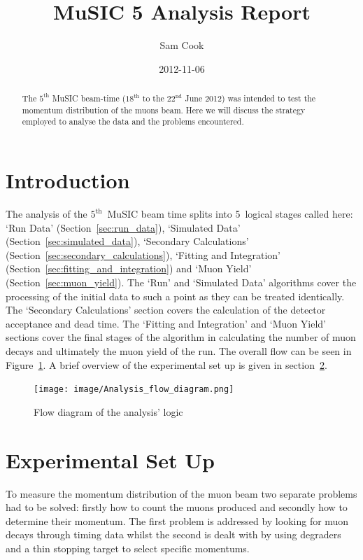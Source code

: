 \documentclass[]{article}
\title{MuSIC 5 Analysis Report}
\author{Sam Cook}
\date{2012-11-06}
\newcommand{\nth}[1]{$#1^\text{th}$}
\newcommand{\nthTwo}[2]{$#1^\text{#2}$}
\begin{document}
\ifpdf
{}
\else
{}
\fi

\maketitle


\begin{abstract}
    The \nth{5} MuSIC beam-time (\nth{18} to the \nthTwo{22}{nd} June 2012) was intended to test the momentum distribution of the muons beam. Here we will discuss the strategy employed to analyse the data and the problems encountered.
\end{abstract}

\section{Introduction} %
\label{sec:introduction}
The analysis of the \nth{5}~MuSIC beam time splits into 5~logical stages called here: `Run Data' (Section~\ref{sec:run_data}), `Simulated Data' (Section~\ref{sec:simulated_data}), `Secondary Calculations' (Section~\ref{sec:secondary_calculations}), `Fitting and Integration' (Section~\ref{sec:fitting_and_integration}) and `Muon Yield' (Section~\ref{sec:muon_yield}). The `Run' and `Simulated Data' algorithms cover the processing of the initial data to such a point as they can be treated identically. The `Secondary Calculations' section covers the calculation of the detector acceptance and dead time. The `Fitting and Integration' and `Muon Yield' sections cover the final stages of the algorithm in calculating the number of muon decays and ultimately the muon yield of the run. The overall flow can be seen in Figure~\ref{fig:analysis_flow_diagrm}. A brief overview of the experimental set up is given in section~\ref{sec:experimental_set_up}.

\begin{figure}[htbp]
    \centering
        \texttt{[image: image/Analysis\_flow\_diagram.png]}
    \caption{Flow diagram of the analysis' logic}
    \label{fig:analysis_flow_diagrm}
\end{figure}
\section{Experimental Set Up} %
\label{sec:experimental_set_up}
To measure the momentum distribution of the muon beam two separate problems had to be solved: firstly how to count the muons produced and secondly how to determine their momentum. The first problem is addressed by looking for muon decays through timing data whilst the second is dealt with by using degraders and a thin stopping target to select specific momentums. 
\end{document}
